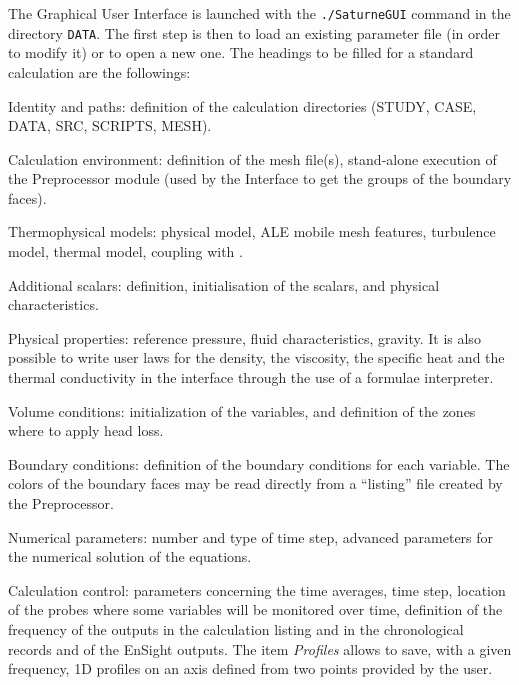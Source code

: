 {{{The Graphical User Interface is launched with the \texttt{./SaturneGUI} command
in the directory \texttt{DATA}. The first step is
then to load an existing parameter file (in order to modify it) or to
open a new one. The headings to be filled for a standard calculation are the
followings:

\begin{list}{-}{}
\item Identity and paths: definition of the calculation directories
      (STUDY, CASE, DATA, SRC, SCRIPTS, MESH).

\item Calculation environment: definition of the mesh file(s),
      stand-alone execution of the Preprocessor module
      (used by the Interface to get the groups of the boundary
      faces).

\item Thermophysical models: physical model, ALE mobile mesh features,
      turbulence model, thermal model, coupling with \syrthes.

\item Additional scalars: definition, initialisation of the scalars,
      and physical characteristics.

\item Physical properties: reference pressure, fluid characteristics, gravity.
      It is also possible to write user laws for the density, the viscosity,
      the specific heat and the thermal conductivity in the interface through
      the use of a formulae interpreter.

\item Volume conditions: initialization of the variables, and definition of
      the zones where to apply head loss.

\item Boundary conditions: definition of the boundary conditions for
      each variable. The colors of the boundary faces may be read
      directly from a ``listing'' file created by the Preprocessor.

\item Numerical parameters: number and type of time step, advanced parameters
      for the numerical solution of the equations.

\item Calculation control: parameters concerning the time averages, time step,
      location of
      the probes where some variables will be monitored over time,
      definition of the frequency of the outputs in the calculation
      listing and in the chronological records and of the EnSight outputs.
      The item {\itshape Profiles} allows to save, with a  given frequency,
      1D profiles on an axis defined from two points provided by the user.


\end{list}}}}
